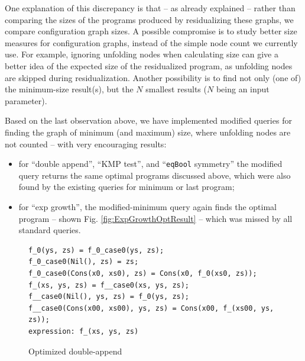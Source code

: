 \documentclass[submission,copyright,creativecommons]{eptcs}
\begin{document}
\begin{itemize}
    One explanation of this discrepancy is that -- as already explained -- rather than comparing the sizes of 
    the programs produced by residualizing these graphs, we compare configuration graph sizes.
    A possible compromise is to study better size measures for configuration graphs, instead
    of the simple node count we currently use.
    For example, ignoring unfolding nodes when calculating size can give a better idea of the expected size
    of the residualized program, as unfolding nodes are skipped during residualization.
    Another possibility is to find not only (one of) the minimum-size result(s), but the $N$ smallest
    results ($N$ being an input parameter).
\end{itemize}
Based on the last observation above, we have implemented modified queries for finding the graph of minimum (and maximum) size, where
unfolding nodes are not counted -- with very encouraging results:
\begin{itemize}
  \item for ``double append'', ``KMP test'', and ``\verb|eqBool| symmetry'' the modified query returns
    the same optimal programs discussed above, which were also found by the existing queries for 
    minimum or last program;
  \item for ``exp growth'', the modified-minimum query again finds the optimal program -- shown Fig. \ref{fig:ExpGrowthOptResult}
    -- which was missed by all standard queries.
\end{itemize}

\begin{figure}
\begin{lstlisting}
f_0(ys, zs) = f_0_case0(ys, zs);
f_0_case0(Nil(), zs) = zs;
f_0_case0(Cons(x0, xs0), zs) = Cons(x0, f_0(xs0, zs));
f_(xs, ys, zs) = f__case0(xs, ys, zs);
f__case0(Nil(), ys, zs) = f_0(ys, zs);
f__case0(Cons(x00, xs00), ys, zs) = Cons(x00, f_(xs00, ys, zs));
expression: f_(xs, ys, zs)
\end{lstlisting}
\caption{Optimized double-append}
\label{fig:DoubleAppResult}
\end{figure}
\end{document}
